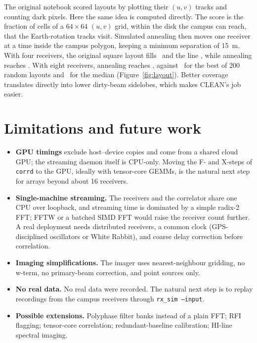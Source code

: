\documentclass[11pt,a4paper]{article}
\begin{document}
The original notebook scored layouts by plotting their $(u,v)$ tracks and counting dark pixels. Here
the same idea is computed directly. The score is the fraction of cells of a $64\times64$ $(u,v)$ grid,
within the disk the campus can reach, that the Earth-rotation tracks visit. Simulated annealing then
moves one receiver at a time inside the campus polygon, keeping a minimum separation of \SI{15}{m}.
With four receivers, the original square layout fills \LayoutLegacySquare\ and the line
\LayoutLegacyLine, while annealing reaches \LayoutAnnealFour. With eight receivers, annealing reaches
\LayoutAnnealEight, against \LayoutRandBestEight\ for the best of 200 random layouts and
\LayoutRandMedEight\ for the median (Figure~\ref{fig:layout}). Better coverage translates directly
into lower dirty-beam sidelobes, which makes CLEAN's job easier.

\section{Limitations and future work}

\begin{itemize}
\item \textbf{GPU timings} exclude host--device copies and come from a shared cloud GPU; the streaming
daemon itself is CPU-only. Moving the F- and X-steps of \texttt{corrd} to the GPU, ideally with
tensor-core GEMMs, is the natural next step for arrays beyond about 16 receivers.
\item \textbf{Single-machine streaming.} The receivers and the correlator share one CPU over
loopback, and streaming time is dominated by a simple radix-2 FFT; FFTW or a batched SIMD FFT
would raise the receiver count further. A real deployment needs distributed receivers, a common clock (GPS-disciplined oscillators
or White Rabbit), and coarse delay correction before correlation.
\item \textbf{Imaging simplifications.} The imager uses nearest-neighbour gridding, no w-term, no
primary-beam correction, and point sources only.
\item \textbf{No real data.} No real data were recorded. The natural next step is to replay
recordings from the campus receivers through \texttt{rx\_sim --input}.
\item \textbf{Possible extensions.} Polyphase filter banks instead of a plain FFT; RFI flagging;
tensor-core correlation; redundant-baseline calibration; HI-line spectral imaging.
\end{itemize}
\end{document}

